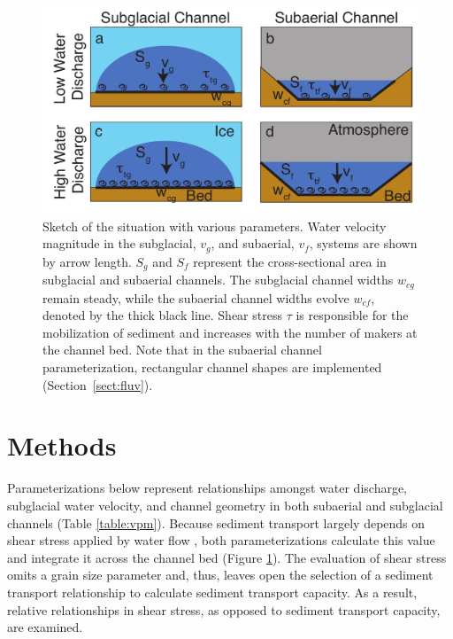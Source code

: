 \documentclass[11pt]{article}
\begin{document}
\begin{center}
  \begin{figure}[h]
    \includegraphics[width=0.8\linewidth]{Fig1.pdf}
    \caption{Sketch of the situation with various parameters. Water velocity magnitude in the subglacial, $v_g$, and subaerial, $v_f$, systems are shown by arrow length. $S_g$ and $S_f$ represent the cross-sectional area in subglacial and subaerial channels. The subglacial channel widths $w_{cg}$ remain steady, while the subaerial channel widths evolve $w_{cf}$, denoted by the thick black line. Shear stress $\tau$ is responsible for the mobilization of sediment and increases with the number of makers at the channel bed. 
      Note that in the subaerial channel parameterization, rectangular channel shapes are implemented (Section~\ref{sect:fluv}).} 
    \label{fig:cartoon}
  \end{figure}
\end{center}


\section{Methods}
\label{sect:meth}
Parameterizations below represent relationships amongst water discharge, subglacial water velocity, and channel geometry in both subaerial and subglacial channels (Table \ref{table:vpm}).
Because sediment transport largely depends on shear stress applied by water flow \citep{shields1936}, both parameterizations calculate this value and integrate  it across the channel bed (Figure \ref{fig:cartoon}).
The evaluation of shear stress omits a grain size parameter and, thus, leaves open the selection of a sediment transport relationship  \citep[e.g.][]{shields1936,meyer1948} to  calculate sediment transport capacity.
As a result, relative relationships in shear stress, as opposed to sediment transport capacity, are examined.
\end{document}
